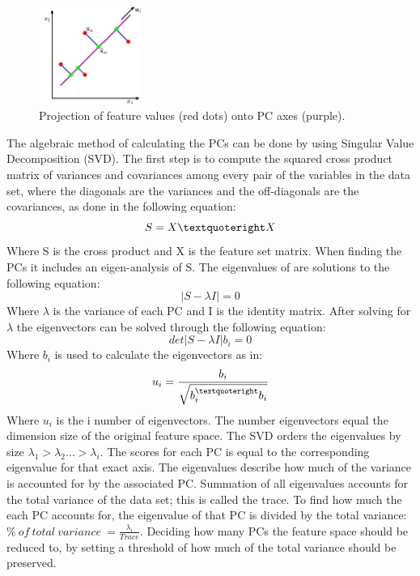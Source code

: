 \begin{figure}[H] 
	\includegraphics[width=0.3\textwidth]{figures/zASP/projection}
	\caption{Projection of feature values (red dots) onto PC axes (purple).}
	\label{projection}
\end{figure}
\vspace{-10pt}
The algebraic method of calculating the PCs can be done by using Singular Value Decomposition (SVD). The first step is to compute the squared cross product matrix of variances and covariances among every pair of the variables in the data set, where the diagonals are the variances and the off-diagonals are the covariances, as done in the following equation:
\begin{equation}
S = X \textquoteright X
\end{equation}
Where S is the cross product and X is the feature set matrix. When finding the PCs it includes an eigen-analysis of S. The eigenvalues of are solutions to the following equation:
\begin{equation}
| S - \lambda I |  = 0
\end{equation}
Where $\lambda$ is the variance of each PC and I is the identity matrix. After solving for $\lambda$ the eigenvectors can be solved through the following equation:
\begin{equation}
det | S - \lambda I | b_{i} = 0
\end{equation}
Where $b_{i}$ is used to calculate the eigenvectors as in:
\begin{eqnarray}
u_{i} = \frac{b_{i}}{\sqrt{b_{i}^{\textquoteright} b_{i}}}
\end{eqnarray}
Where $u_{i}$ is the i number of eigenvectors. The number eigenvectors equal the dimension size of the original feature space. 
The SVD orders the eigenvalues by size $\lambda_{1} > \lambda_{2} … > \lambda_{i}$. The scores for each PC is equal to the corresponding eigenvalue for that exact axis. The eigenvalues describe how much of the variance is accounted for by the associated PC. Summation of all eigenvalues accounts for the total variance of the data set; this is called the trace. To find how much the each PC accounts for, the eigenvalue of that PC is divided by the total variance: $\%~ of~ total~ variance~ = \frac{\lambda_{i}}{Trace}$. Deciding how many PCs the feature space should be reduced to, by setting a threshold of how much of the total variance should be preserved.

